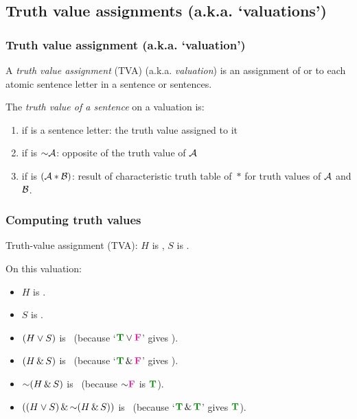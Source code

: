 \subsection{Truth value assignments (a.k.a. `valuations')}

\begin{frame}
 \frametitle{Truth value assignment (a.k.a. `valuation')}

  \begin{definition}
  A \emph{truth value assignment} (TVA) (a.k.a. \emph{valuation}) is an assignment of \emph{\True} or \emph{\False} to each
  atomic sentence letter in a sentence or sentences.
  \end{definition}

  \begin{definition}
  The \emph{truth value of a sentence}  on a valuation is:
  \begin{enumerate}
  \item if  is a sentence letter: the truth value assigned to
  it
  \item if  is $\enot \metav{A}$: opposite of the truth value of
  $\mathcal{A}$
  \item if  is $(\mathcal{A} \ast \mathcal{B})$:
  result of characteristic truth table of~$\ast$ for truth values of
  $\mathcal{A}$ and $\mathcal{B}$.
  \end{enumerate}
  \end{definition}
\end{frame}

\begin{frame}
  \frametitle{Computing truth values}

Truth-value assignment (TVA): $H$ is \True, $S$ is \False.

On this valuation:

  \begin{itemize}
    \item $H$ is \True.
    \item $S$ is \False.
    \item $(H \vee S)$ is \True\ (because `$\True \eor \False$' gives \True).
    \item $(H \,\&\, S)$ is \False\ (because `$\True \eand \False$' gives \False).
    \item $\enot (H \eand S)$ is \True\ (because $\enot \False$ is $\True$).
    \item $((H \eor S) \eand \enot (H \eand S))$ is \True\
    (because `$\True \eand \True$' gives $\True$).
  \end{itemize}

\end{frame}

